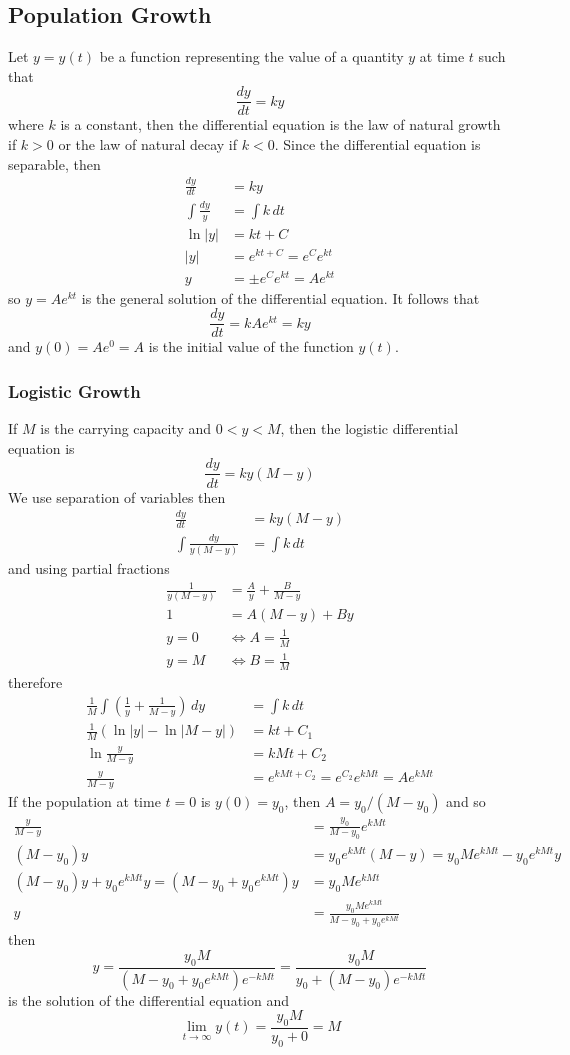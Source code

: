 \subsection{Population Growth}
Let \(y=y(t)\) be a function representing the value of a quantity \(y\) at
time \(t\) such that
\[\frac{dy}{dt}=ky\]
where \(k\) is a constant, then the differential equation is the law of
natural growth if \(k>0\) or the law of natural decay if \(k<0\).
Since the differential equation is separable, then
\begin{align*}
    \frac{dy}{dt} &= ky \\
    \int\frac{dy}{y} &= \int k\,dt \\
    \ln|y| &= kt+C \\
    |y| &= e^{kt+C}=e^Ce^{kt} \\
    y &= \pm e^Ce^{kt}=Ae^{kt}
\end{align*}
so \(y=Ae^{kt}\) is the general solution of the differential equation.
It follows that
\[\frac{dy}{dt}=kAe^{kt}=ky\]
and \(y(0)=Ae^0=A\) is the initial value of the function \(y(t)\).

\subsubsection{Logistic Growth}
If \(M\) is the carrying capacity and \(0<y<M\), then the logistic
differential equation is
\[\frac{dy}{dt}=ky(M-y)\]
We use separation of variables then
\begin{align*}
    \frac{dy}{dt} &= ky(M-y) \\
    \int\frac{dy}{y(M-y)} &= \int k\,dt
\end{align*}
and using partial fractions
\begin{align*}
    \frac{1}{y(M-y)} &= \frac{A}{y}+\frac{B}{M-y} \\
    1 &= A(M-y)+By \\
    y=0 &\iff A=\frac{1}{M} \\
    y=M &\iff B=\frac{1}{M}
\end{align*}
therefore
\begin{align*}
    \frac{1}{M}\int\left(\frac{1}{y}+\frac{1}{M-y}\right)\,dy &= \int k\,dt \\
    \frac{1}{M}(\ln|y|-\ln|M-y|) &= kt+C_1 \\
    \ln\frac{y}{M-y} &= kMt+C_2 \\
    \frac{y}{M-y} &= e^{kMt+C_2}=e^{C_2}e^{kMt}=Ae^{kMt}
\end{align*}
If the population at time \(t=0\) is \(y(0)=y_0\),
then \(A=y_0/(M-y_0)\) and so
\begin{align*}
    \frac{y}{M-y} &= \frac{y_0}{M-y_0}e^{kMt} \\
    (M-y_0)y &= y_0e^{kMt}(M-y)=y_0Me^{kMt}-y_0e^{kMt}y \\
    (M-y_0)y+y_0e^{kMt}y=(M-y_0+y_0e^{kMt})y &= y_0Me^{kMt} \\
    y &= \frac{y_0Me^{kMt}}{M-y_0+y_0e^{kMt}}
\end{align*}
then
\[y=\frac{y_0M}{(M-y_0+y_0e^{kMt})e^{-kMt}}=\frac{y_0M}{y_0+(M-y_0)e^{-kMt}}\]
is the solution of the differential equation and
\[\lim_{t\to\infty}y(t)=\frac{y_0M}{y_0+0}=M\]
